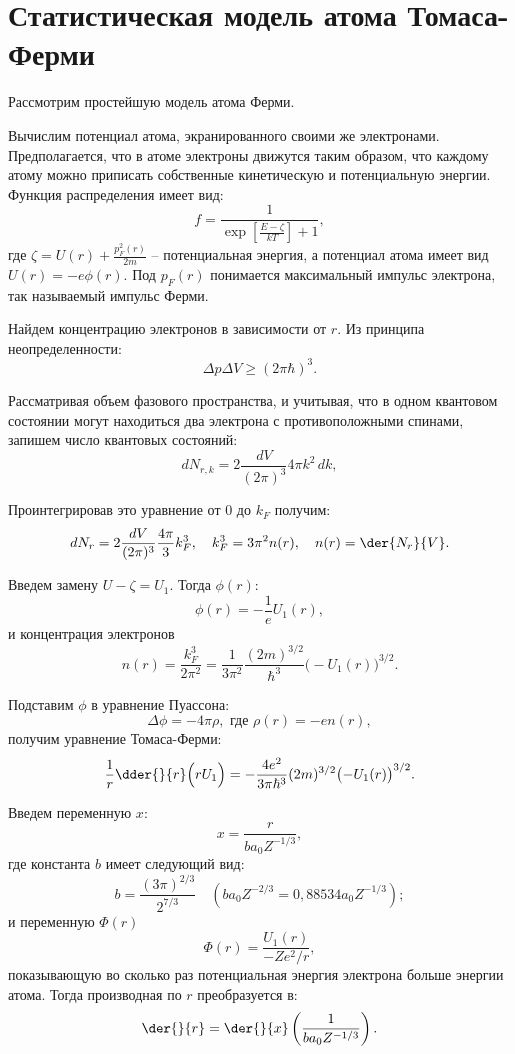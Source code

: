 \chapter{Статистическая модель атома Томаса-Ферми}

Рассмотрим простейшую модель атома Ферми.

Вычислим потенциал атома, экранированного своими же электронами. Предполагается,
что в атоме электроны движутся таким образом, что каждому атому можно приписать
собственные кинетическую и потенциальную энергии. Функция распределения имеет
вид:
\[
  f = \frac{1}{\exp[\frac{E - \zeta}{kT}] + 1},
\]
где \( \zeta = U(r) + \frac{p_F^2(r)}{2m} \) -- потенциальная энергия, а
потенциал атома имеет вид \( U(r) = -e\phi(r) \). Под \( p_F(r) \) понимается
максимальный импульс электрона, так называемый импульс Ферми.

Найдем концентрацию электронов в зависимости от \( r \). Из принципа
неопределенности:
\[
  \Delta p\Delta V \geq (2\pi\hbar)^3.
\]

Рассматривая объем фазового пространства, и учитывая, что в одном квантовом
состоянии могут находиться два электрона с противоположными спинами, запишем
число квантовых состояний:
\[
  dN_{r, k} = 2\frac{dV}{(2\pi)^3}4\pi k^2\,dk,
\]

Проинтегрировав это уравнение от \( 0 \) до \( k_F \) получим:
\[
  dN_r = 2\frac{dV}{(2\pi)^3} \frac{4\pi}{3} k_F^3, \quad k_F^3 = 3\pi^2 n(r),
    \quad n(r) = \der{N_r}{V}.
\]

Введем замену \( U - \zeta = U_1 \). Тогда \( \phi(r) \):
\[
  \phi(r) = -\frac{1}{e} U_1(r),
\]
и концентрация электронов
\[
  n(r) = \frac{k_F^3}{2\pi^2} = \frac{1}{3\pi^2} \frac{(2m)^{3 / 2}}{\hbar^3}
    \bigl(-U_1(r)\big)^{3 / 2}.
\]

Подставим \( \phi \) в уравнение Пуассона:
\[
  \Delta\phi = -4\pi\rho, \text{ где } \rho(r) = -en(r),
\]
получим уравнение Томаса-Ферми:
\[
  \frac{1}{r} \dder{}{r}\Bigl(rU_1\Big) = -\frac{4e^2}{3\pi\hbar^3}
    (2m)^{3 / 2}\bigl(-U_1(r)\big)^{3 / 2}.
\]

Введем переменную \( x \):
\[
  x = \frac{r}{ba_0Z^{-1 / 3}},
\]
где константа \( b \) имеет следующий вид:
\[
  b = \frac{(3\pi)^{2 / 3}}{2^{7 / 3}} \quad
  \left(ba_0Z^{-2 / 3} = 0,\!88534a_0Z^{-1 / 3}\right);
\]
и переменную \( \Phi(r) \)
\[
  \Phi(r) = \frac{U_1(r)}{-Ze^2/r},
\]
показывающую во сколько раз потенциальная энергия электрона больше энергии
атома. Тогда производная по \( r \) преобразуется в:
\[
  \der{}{r} = \der{}{x} \left( \frac{1}{ba_0Z^{-1 / 3}} \right).
\]

